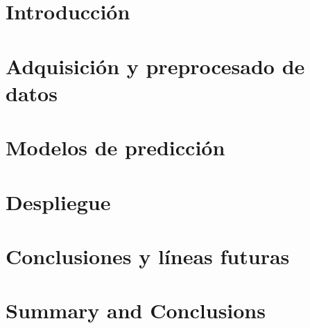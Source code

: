 \documentclass[spanish,a4paper,12pt,oneside]{extreport}
\begin{document}
\chapter{\LARGE Introducción}
\label{chapter:intro}



\newpage{\pagestyle{empty}}
\thispagestyle{empty}

\chapter{\LARGE Adquisición y preprocesado de datos}
\label{chapter:dos}



\newpage{\pagestyle{empty}}
\thispagestyle{empty}

\chapter{\LARGE Modelos de predicción}
\label{chapter:tres}



\newpage{\pagestyle{empty}}
\thispagestyle{empty}

\chapter{\LARGE Despliegue}
\label{chapter:cuatro}



\newpage{\pagestyle{empty}}
\thispagestyle{empty}

\chapter{\LARGE Conclusiones y líneas futuras}
\label{chapter:Resultados}



\newpage{\pagestyle{empty}}
\thispagestyle{empty}

\chapter{\LARGE Summary and Conclusions}
\label{chapter:Conclusiones}
\end{document}
